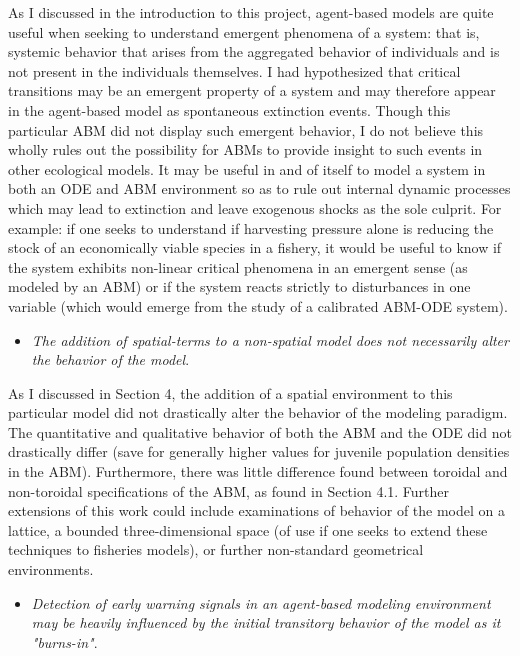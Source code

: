 \documentclass[12pt]{article}
\begin{document}
As I discussed in the introduction to this project, agent-based models are quite useful when seeking to understand emergent phenomena of a system: that is, systemic behavior that arises from the aggregated behavior of individuals and is not present in the individuals themselves. I had hypothesized that critical transitions may be an emergent property of a system and may therefore appear in the agent-based model as spontaneous extinction events. Though this particular ABM did not display such emergent behavior, I do not believe this wholly rules out the possibility for ABMs to provide insight to such events in other ecological models. It may be useful in and of itself to model a system in both an ODE and ABM environment so as to rule out internal dynamic processes which may lead to extinction and leave exogenous shocks as the sole culprit. For example: if one seeks to understand if harvesting pressure alone is reducing the stock of an economically viable species in a fishery, it would be useful to know if the system exhibits non-linear critical phenomena in an emergent sense (as modeled by an ABM) or if the system reacts strictly to disturbances in one variable (which would emerge from the study of a calibrated ABM-ODE system). \\

\begin{itemize}
	\item \emph{The addition of spatial-terms to a non-spatial model does not necessarily alter the behavior of the model}.
\end{itemize} 

As I discussed in Section 4, the addition of a spatial environment to this particular model did not drastically alter the behavior of the modeling paradigm. The quantitative and qualitative behavior of both the ABM and the ODE did not drastically differ (save for generally higher values for juvenile population densities in the ABM). Furthermore, there was little difference found between toroidal and non-toroidal specifications of the ABM, as found in Section 4.1. Further extensions of this work could include examinations of behavior of the model on a lattice, a bounded three-dimensional space (of use if one seeks to extend these techniques to fisheries models), or further non-standard geometrical environments. \\

\begin{itemize}
	\item \emph{Detection of early warning signals in an agent-based modeling environment may be heavily influenced by the initial transitory behavior of the model as it "burns-in"}.
\end{itemize}
\end{document}
